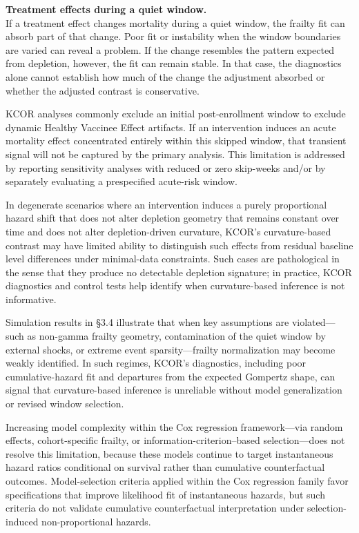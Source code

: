 \documentclass[
]{article}
\begin{document}
\textbf{Treatment effects during a quiet window.}\\
If a treatment effect changes mortality during a quiet window, the frailty fit can absorb part of that change. Poor fit or instability when the window boundaries are varied can reveal a problem. If the change resembles the pattern expected from depletion, however, the fit can remain stable. In that case, the diagnostics alone cannot establish how much of the change the adjustment absorbed or whether the adjusted contrast is conservative.

KCOR analyses commonly exclude an initial post-enrollment window to exclude dynamic Healthy Vaccinee Effect artifacts. If an intervention induces an acute mortality effect concentrated entirely within this skipped window, that transient signal will not be captured by the primary analysis. This limitation is addressed by reporting sensitivity analyses with reduced or zero skip-weeks and/or by separately evaluating a prespecified acute-risk window.

In degenerate scenarios where an intervention induces a purely proportional hazard shift that does not alter depletion geometry that remains constant over time and does not alter depletion-driven curvature, KCOR's curvature-based contrast may have limited ability to distinguish such effects from residual baseline level differences under minimal-data constraints. Such cases are pathological in the sense that they produce no detectable depletion signature; in practice, KCOR diagnostics and control tests help identify when curvature-based inference is not informative.

Simulation results in §3.4 illustrate that when key assumptions are violated---such as non-gamma frailty geometry, contamination of the quiet window by external shocks, or extreme event sparsity---frailty normalization may become weakly identified. In such regimes, KCOR's diagnostics, including poor cumulative-hazard fit and departures from the expected Gompertz shape, can signal that curvature-based inference is unreliable without model generalization or revised window selection.

Increasing model complexity within the Cox regression framework---via random effects, cohort-specific frailty, or information-criterion--based selection---does not resolve this limitation, because these models continue to target instantaneous hazard ratios conditional on survival rather than cumulative counterfactual outcomes. Model-selection criteria applied within the Cox regression family favor specifications that improve likelihood fit of instantaneous hazards, but such criteria do not validate cumulative counterfactual interpretation under selection-induced non-proportional hazards.
\end{document}
